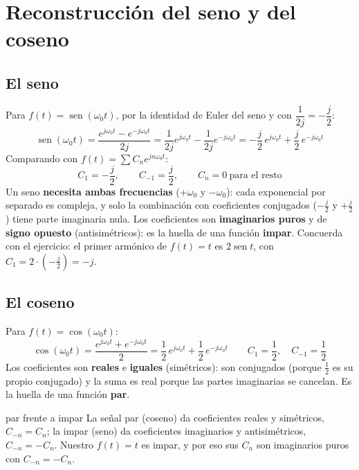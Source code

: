 \documentclass[11pt,a4paper]{article}
\DeclareMathOperator{\sen}{sen}
\begin{document}
\FloatBarrier
\section{Reconstrucción del seno y del coseno}

\subsection{El seno}
Para $f(t)=\sen(\omega_0t)$, por la identidad de Euler del seno y con
$\dfrac{1}{2j}=-\dfrac{j}{2}$:
\begin{equation*}
  \sen(\omega_0t)=\frac{e^{j\omega_0t}-e^{-j\omega_0t}}{2j}
  =\frac{1}{2j}e^{j\omega_0t}-\frac{1}{2j}e^{-j\omega_0t}
  =\boxed{-\frac{j}{2}\,e^{j\omega_0t}+\frac{j}{2}\,e^{-j\omega_0t}}
\end{equation*}
Comparando con $f(t)=\sum C_ne^{jn\omega_0t}$:
\begin{equation*}
  C_1=-\frac{j}{2},\qquad C_{-1}=\frac{j}{2},\qquad C_n=0\ \text{para el resto}
\end{equation*}
Un seno \textbf{necesita ambas frecuencias} ($+\omega_0$ y $-\omega_0$): cada exponencial
por separado es compleja, y solo la combinación con coeficientes conjugados ($-\tfrac{j}{2}$
y $+\tfrac{j}{2}$) tiene parte imaginaria nula. Los coeficientes son \textbf{imaginarios
puros} y de \textbf{signo opuesto} (antisimétricos): es la huella de una función
\textbf{impar}. Concuerda con el ejercicio: el primer armónico de $f(t)=t$ es $2\sen t$,
con $C_1=2\cdot\left(-\tfrac{j}{2}\right)=-j$.

\subsection{El coseno}
Para $f(t)=\cos(\omega_0t)$:
\begin{equation*}
  \cos(\omega_0t)=\frac{e^{j\omega_0t}+e^{-j\omega_0t}}{2}
  =\boxed{\frac{1}{2}\,e^{j\omega_0t}+\frac{1}{2}\,e^{-j\omega_0t}}
  \qquad C_1=\frac{1}{2},\quad C_{-1}=\frac{1}{2}
\end{equation*}
Los coeficientes son \textbf{reales} e \textbf{iguales} (simétricos): son conjugados
(porque $\tfrac{1}{2}$ es su propio conjugado) y la suma es real porque las partes
imaginarias se cancelan. Es la huella de una función \textbf{par}.

\begin{notatec}{par frente a impar}
La señal par (coseno) da coeficientes reales y simétricos, $C_{-n}=C_n$; la impar (seno)
da coeficientes imaginarios y antisimétricos, $C_{-n}=-C_n$. Nuestro $f(t)=t$ es impar,
y por eso sus $C_n$ son imaginarios puros con $C_{-n}=-C_n$.
\end{notatec}
\end{document}
